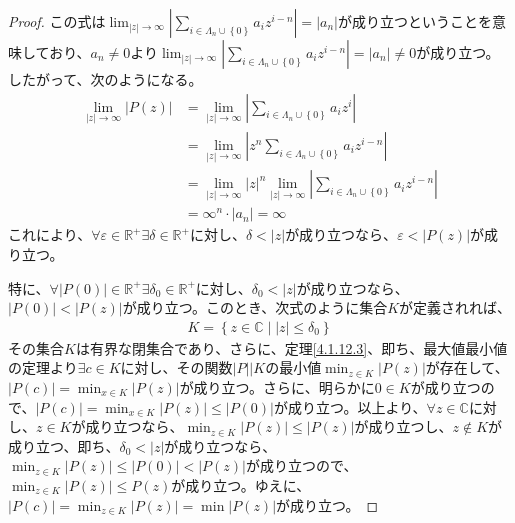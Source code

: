 \documentclass[dvipdfmx]{jsarticle}
\begin{document}
\begin{proof}
この式は$\lim_{|z| \rightarrow \infty}\left| \sum_{i \in \varLambda_{n} \cup \left\{ 0 \right\}} {a_{i}z^{i - n}} \right| = \left| a_{n} \right|$が成り立つということを意味しており、$a_{n} \neq 0$より$\lim_{|z| \rightarrow \infty}\left| \sum_{i \in \varLambda_{n} \cup \left\{ 0 \right\}} {a_{i}z^{i - n}} \right| = \left| a_{n} \right| \neq 0$が成り立つ。したがって、次のようになる。
\begin{align*}
\lim_{|z| \rightarrow \infty}\left| P(z) \right| &= \lim_{|z| \rightarrow \infty}\left| \sum_{i \in \varLambda_{n} \cup \left\{ 0 \right\}} {a_{i}z^{i}} \right|\\
&= \lim_{|z| \rightarrow \infty}\left| z^{n}\sum_{i \in \varLambda_{n} \cup \left\{ 0 \right\}} {a_{i}z^{i - n}} \right|\\
&= \lim_{|z| \rightarrow \infty}|z|^{n}\lim_{|z| \rightarrow \infty}\left| \sum_{i \in \varLambda_{n} \cup \left\{ 0 \right\}} {a_{i}z^{i - n}} \right|\\
&= \infty^{n} \cdot \left| a_{n} \right| = \infty
\end{align*}
これにより、$\forall\varepsilon \in \mathbb{R}^{+}\exists\delta \in \mathbb{R}^{+}$に対し、$\delta < |z|$が成り立つなら、$\varepsilon < \left| P(z) \right|$が成り立つ。\par
特に、$\forall\left| P(0) \right| \in \mathbb{R}^{+}\exists\delta_{0} \in \mathbb{R}^{+}$に対し、$\delta_{0} < |z|$が成り立つなら、$\left| P(0) \right| < \left| P(z) \right|$が成り立つ。このとき、次式のように集合$K$が定義されれば、
\begin{align*}
K = \left\{ z \in \mathbb{C} \middle| |z| \leq \delta_{0} \right\}
\end{align*}
その集合$K$は有界な閉集合であり、さらに、定理\ref{4.1.12.3}、即ち、最大値最小値の定理より$\exists c \in K$に対し、その関数$|P||K$の最小値$\min_{z \in K}\left| P(z) \right|$が存在して、$\left| P(c) \right| = \min_{x \in K}\left| P(z) \right|$が成り立つ。さらに、明らかに$0 \in K$が成り立つので、$\left| P(c) \right| = \min_{x \in K}\left| P(z) \right| \leq \left| P(0) \right|$が成り立つ。以上より、$\forall z \in \mathbb{C}$に対し、$z \in K$が成り立つなら、$\min_{z \in K}\left| P(z) \right| \leq \left| P(z) \right|$が成り立つし、$z \notin K$が成り立つ、即ち、$\delta_{0} < |z|$が成り立つなら、$\min_{z \in K}\left| P(z) \right| \leq \left| P(0) \right| < \left| P(z) \right|$が成り立つので、$\min_{z \in K}\left| P(z) \right| \leq P(z)$が成り立つ。ゆえに、$\left| P(c) \right| = \min_{z \in K}\left| P(z) \right| = \min\left| P(z) \right|$が成り立つ。\par

\end{proof}
\end{document}
